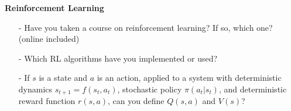 \documentclass{article}
\begin{document}
\newline
\quad
\newline
\noindent \textbf{Reinforcement Learning}
\newline
\begin{itemize}
\item[-] Have you taken a course on reinforcement learning? If so, which one? (online included)
\item[-] Which RL algorithms have you implemented or used?
\item[-] If $s$ is a state and $a$ is an action, applied to a system with deterministic dynamics $s_{t+1} = f(s_t, a_t)$, stochastic policy $\pi(a_t|s_t)$, and deterministic reward function $r(s,a)$, can you define $Q(s,a)$ and $V(s)$?

\end{itemize}
\newline
\end{document}
